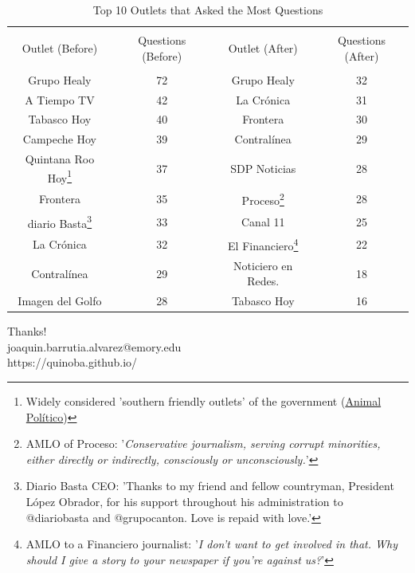 \documentclass[10pt,aspectratio=169]{beamer}
\begin{document}
\begin{frame}

\begin{table}[!htpb]
    \centering
    \scriptsize
    \caption{Top 10 Outlets that Asked the Most Questions}
    \label{tab:outlets}
    \begin{tabular}{cccc}
\hline \\
Outlet (Before) & Questions (Before) & Outlet (After) & Questions (After) \\
\hline\\
Grupo Healy & 72 &  Grupo Healy & 32 \\
 A Tiempo TV  & 42 &  La Crónica & 31 \\
 Tabasco Hoy & 40 & Frontera & 30 \\
 Campeche Hoy & 39 &  Contralínea & 29 \\
 Quintana Roo Hoy\footnote{\tiny Widely considered 'southern friendly outlets' of the government (\href{https://animalpolitico.com/verificacion-de-hechos/te-explico/amlo-medios-promesas-publicidad-oficial}{Animal Político})} & 37 &  SDP Noticias & 28 \\
Frontera & 35 &  Proceso\footnote{\tiny AMLO of Proceso: '\textit{Conservative journalism, serving corrupt minorities, either directly or indirectly, consciously or unconsciously.}'}  & 28 \\
 diario Basta\footnote{\tiny Diario Basta CEO: 'Thanks to my friend and fellow countryman, President López Obrador, for his support throughout his administration to @diariobasta and @grupocanton. Love is repaid with love.'} & 33 &  Canal 11 & 25 \\
 La Crónica & 32 &  El Financiero\footnote{\tiny AMLO to a Financiero journalist: '\textit{I don't want to get involved in that. Why should I give a story to your newspaper if you're against us?}'} & 22 \\
 Contralínea & 29 &  Noticiero en Redes. & 18 \\
 Imagen del Golfo  & 28 &  Tabasco Hoy & 16 \\
\hline
\end{tabular}
\end{table}
\end{frame}


{
\begin{frame}[standout]

Thanks!\\

\small  {} joaquin.barrutia.alvarez@emory.edu \\
\small {} https://quinoba.github.io/ \\
\end{frame}
}
\end{document}
